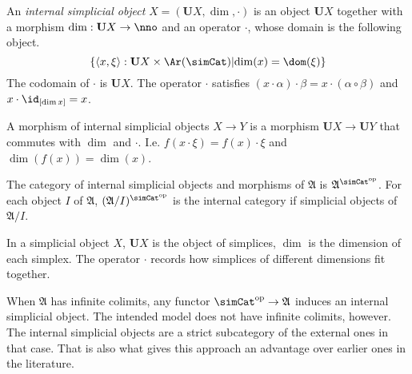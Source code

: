 \documentclass{tac}
\newcommand\hide[1]{}
\newcommand\set[1]{\left\{#1\right\}}
\newcommand\dual{^{\mathrm{op}}}
\newcommand\s{^{\simCat\dual}}
\newcommand\of{:}
\newcommand\tuplet[1]{\left\langle #1 \right\rangle}
\newcommand\base{\mathbf{U}}
\newcommand\ambient{\mathfrak A}
\begin{document}
\begin{definition} An \emph{internal simplicial object} $X=(\base X,\dim,\cdot)$ is an object $\base X$ together with a morphism $\dim\of \base X\to\nno$ and an operator $\cdot$, whose domain is the following object.
\[ \set{\tuplet{x,\xi}\of \base X\times\Ar(\simCat)\middle| \dim (x)=\dom(\xi)} \]
The codomain of $\cdot$ is $\base X$. The operator $\cdot$ satisfies $(x\cdot\alpha)\cdot\beta=x\cdot(\alpha\circ\beta)$ and $x\cdot\id_{[\dim x]}=x$.  

A morphism of internal simplicial objects $X\to Y$ is a morphism $\base X\to \base Y$ that commutes with $\dim$ and $\cdot$. I.e. $f(x\cdot \xi)=f(x)\cdot\xi$ and $\dim(f(x))=\dim(x)$.

The category of internal simplicial objects and morphisms of $\ambient$ is $\ambient\s$. For each object $I$ of $\ambient$, $(\ambient/I)\s$ is the internal category if simplicial objects of $\ambient/I$.
\end{definition}\hide{ Is it feasible to rewrite the whole paper with these?}

In a simplicial object $X$, $\base X$ is the object of simplices, $\dim$ is the dimension of each simplex. The operator $\cdot$ records how simplices of different dimensions fit together. 

\begin{remark} When $\ambient$ has infinite colimits, any functor $\simCat\dual\to\ambient$ induces an internal simplicial object. The intended model does not have infinite colimits, however. The internal simplicial objects are a strict subcategory of the external ones in that case. That is also what gives this approach an advantage over earlier ones in the literature.%
\end{remark}

\hide{
\subsection{Families}
\begin{defin}
For each object $I$ of $\ambient$ the category $\ambient/I\s$ of simplicial objects in the slice $\ambient/I$ is an \emph{$I$-indexed families of simplicial objects}. 
\end{defin}

Is there anything to prove here?

Other thought: maybe treat the equivalence of $\ambient\s/J$ with $\ambient^{EJ}\s$ here, with $EJ$ the category of elements of the simplicial set $J$.

}
\end{document}
